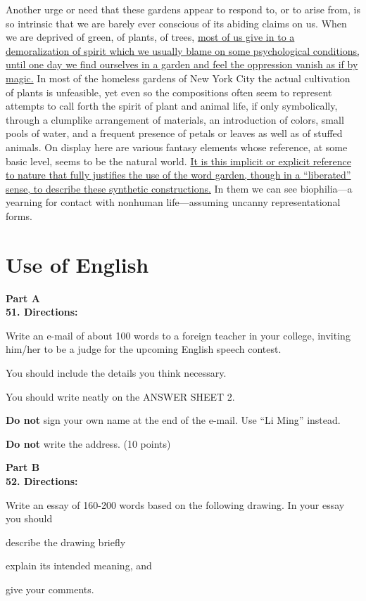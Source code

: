 Another urge or need that these gardens appear to respond to, or to
arise from, is so intrinsic that we are barely ever conscious of its
abiding claims on us. When we are deprived of green, of plants, of
trees, \transnum \uline{ most of us give in to a demoralization of spirit
	which we usually blame on some psychological conditions, until one day
	we find ourselves in a garden and feel the oppression vanish as if by
	magic.} In most of the homeless gardens of New York City the actual
cultivation of plants is unfeasible, yet even so the compositions often
seem to represent attempts to call forth the spirit of plant and animal
life, if only symbolically, through a clumplike arrangement of
materials, an introduction of colors, small pools of water, and a
frequent presence of petals or leaves as well as of stuffed animals. On
display here are various fantasy elements whose reference, at some basic
level, seems to be the natural world. \transnum \uline{It is this
	implicit or explicit reference to nature that fully justifies the use of
	the word garden, though in a ``liberated''
	sense, to describe these synthetic constructions.} In them we can see
biophilia---a yearning for contact with nonhuman life---assuming uncanny
representational forms.

\newpage

\section{Use of English}


\noindent
\textbf{Part A}\\
\textbf{51. Directions:}

Write an e-mail of about 100 words to a foreign teacher in your college,
inviting him/her to be a judge for the upcoming English speech contest.

You should include the details you think necessary.

You should write neatly on the ANSWER SHEET 2.

\textbf{Do not} sign your own name at the end of the e-mail. Use ``Li Ming''
instead.

\textbf{Do not} write the address. (10 points)



\vspace{3em}

\noindent
\textbf{Part B}\\
\textbf{52. Directions:}

Write an essay of 160-200 words based on the following drawing. In your
essay you should
\begin{listwrite}
	\item
	describe the drawing briefly

\item 
 explain its intended meaning, and

\item 
 give your comments.
\end{listwrite}

